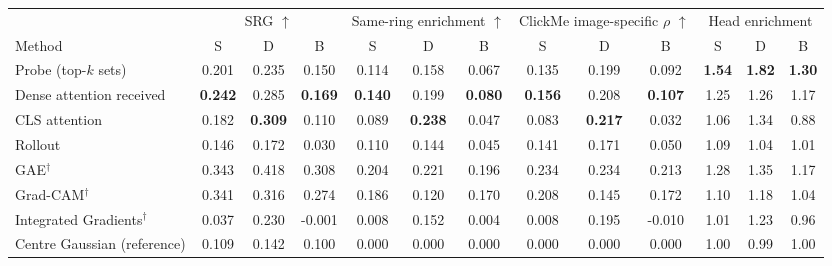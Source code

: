 \begin{tabular}{lcccccccccccc}
\toprule
 & \multicolumn{3}{c}{SRG $\uparrow$} & \multicolumn{3}{c}{Same-ring enrichment $\uparrow$} & \multicolumn{3}{c}{ClickMe image-specific $\rho$ $\uparrow$} & \multicolumn{3}{c}{Head enrichment} \\
\cmidrule(lr){2-4} \cmidrule(lr){5-7} \cmidrule(lr){8-10} \cmidrule(lr){11-13}
Method & S & D & B & S & D & B & S & D & B & S & D & B \\
\midrule
Probe (top-$k$ sets) & 0.201 & 0.235 & 0.150 & 0.114 & 0.158 & 0.067 & 0.135 & 0.199 & 0.092 & \textbf{1.54} & \textbf{1.82} & \textbf{1.30} \\
Dense attention received & \textbf{0.242} & 0.285 & \textbf{0.169} & \textbf{0.140} & 0.199 & \textbf{0.080} & \textbf{0.156} & 0.208 & \textbf{0.107} & 1.25 & 1.26 & 1.17 \\
CLS attention & 0.182 & \textbf{0.309} & 0.110 & 0.089 & \textbf{0.238} & 0.047 & 0.083 & \textbf{0.217} & 0.032 & 1.06 & 1.34 & 0.88 \\
Rollout & 0.146 & 0.172 & 0.030 & 0.110 & 0.144 & 0.045 & 0.141 & 0.171 & 0.050 & 1.09 & 1.04 & 1.01 \\
\midrule
GAE$^\dagger$ & 0.343 & 0.418 & 0.308 & 0.204 & 0.221 & 0.196 & 0.234 & 0.234 & 0.213 & 1.28 & 1.35 & 1.17 \\
Grad-CAM$^\dagger$ & 0.341 & 0.316 & 0.274 & 0.186 & 0.120 & 0.170 & 0.208 & 0.145 & 0.172 & 1.10 & 1.18 & 1.04 \\
Integrated Gradients$^\dagger$ & 0.037 & 0.230 & -0.001 & 0.008 & 0.152 & 0.004 & 0.008 & 0.195 & -0.010 & 1.01 & 1.23 & 0.96 \\
\midrule
Centre Gaussian (reference) & 0.109 & 0.142 & 0.100 & 0.000 & 0.000 & 0.000 & 0.000 & 0.000 & 0.000 & 1.00 & 0.99 & 1.00 \\
\bottomrule
\end{tabular}

